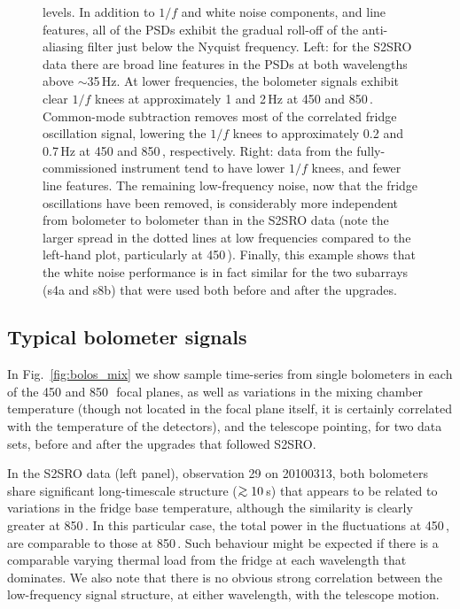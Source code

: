 \documentclass[useAMS,usenatbib,nofootinbib]{mn2e}
\def\gsim{\mathrel{\lower2.5pt\vbox{\lineskip=0pt\baselineskip=0pt
          \hbox{$>$}\hbox{$\sim$}}}}
\begin{document}
\begin{figure}
{  levels. In addition to $1/f$ and white noise components, and line
  features, all of the PSDs exhibit the gradual roll-off of the
  anti-aliasing filter just below the Nyquist frequency.  Left: for
  the S2SRO data there are broad line features in the PSDs at both
  wavelengths above $\sim$35\,Hz.  At lower frequencies, the bolometer
  signals exhibit clear $1/f$ knees at approximately 1 and 2\,Hz at
  450 and 850\,\micron. Common-mode subtraction removes most of the
  correlated fridge oscillation signal, lowering the $1/f$ knees to
  approximately 0.2 and 0.7\,Hz at 450 and 850\,\micron,
  respectively. Right: data from the fully-commissioned instrument
  tend to have lower $1/f$ knees, and fewer line features. The
  remaining low-frequency noise, now that the fridge oscillations have
  been removed, is considerably more independent from bolometer to
  bolometer than in the S2SRO data (note the larger spread in the
  dotted lines at low frequencies compared to the left-hand plot,
  particularly at 450\,\micron). Finally, this example shows that the
  white noise performance is in fact similar for the two subarrays
  (s4a and s8b) that were used both before and after the upgrades.}
\label{fig:pspec}
\end{figure}


\subsection{Typical bolometer signals}
\label{sec:bolosignal}

In Fig.~\ref{fig:bolos_mix} we show sample time-series from single
bolometers in each of the 450 and 850\,\micron\ focal planes, as well
as variations in the mixing chamber temperature (though not located in
the focal plane itself, it is certainly correlated with the
temperature of the detectors), and the telescope pointing, for two
data sets, before and after the upgrades that followed S2SRO.

In the S2SRO data (left panel), observation 29 on 20100313, both
bolometers share significant long-timescale structure ($\gsim10$\,s)
that appears to be related to variations in the fridge base
temperature, although the similarity is clearly greater at
850\,\micron. In this particular case, the total power in the
fluctuations at 450\,\micron, are comparable to those at
850\,\micron. Such behaviour might be expected if there is a
comparable varying thermal load from the fridge at each wavelength
that dominates. We also note that there is no obvious strong
correlation between the low-frequency signal structure, at either
wavelength, with the telescope motion.
\end{document}
